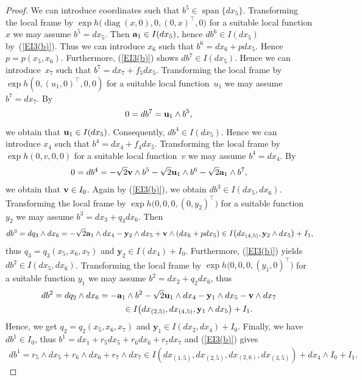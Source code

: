 \documentclass[11pt]{article}
\numberwithin{equation}{section}
\newcommand\bu{{\mathbf u}}
\newcommand\by{{\mathbf y}}
\newcommand\bv{{\mathbf v}}
\newcommand{\Span}{\operatorname{span}}
\newcommand{\diag}{\operatorname{diag}}
\begin{document}
\begin{proof} We can introduce coordinates such that $b^5\in\Span\{dx_5\}$. Transforming the local frame by $\exp h\big(\diag(x,0),0,(0,x)^\top,0\big)$ for a suitable local function $x$ we may assume $b^5=dx_5$. 	 Then ${\bf a}_ 1 \in I(dx_5)$, hence $db^6\in I(dx_5)$ by~(\ref{EI3(b)}). Thus we can introduce $x_6$ such that $b^6=dx_6 +p dx_5$. Hence $p=p(x_5,x_6)$. Furthermore, (\ref{EI3(b)}) shows $db^7\in I(dx_5)$. Hence we can introduce~$x_7$ such that $b^7=dx_7+f_5 dx_5$. Transforming the local frame by $\exp h(0,(u_1,0)^\top,0,0)$ for a suitable local function~$u_1$ we may assume $b^7=dx_7$. By
\begin{gather*}
0 = d b^7 = {\bf u}_1 \wedge b^5,
\end{gather*}
we obtain that ${\bf u}_1 \in I (dx_5)$. Consequently, $db^4 \in I(dx_5)$. Hence we can introduce $x_4$ such that $b^4 = dx_4 + f_4 dx_5$. Transforming the local frame by $\exp h(0, v, 0, 0)$ for a suitable local function~$v$ we may assume $b^4 = dx_4$. By
\begin{gather*}
0 = d b^4 = - \sqrt{2} {\bf v} \wedge b^5 - \sqrt{2} {\bf u}_1 \wedge b^6 - \sqrt{2} {\bf a}_1 \wedge b^7,
\end{gather*}
we obtain that ${\bf v} \in I_0$. Again by (\ref{EI3(b)}), we obtain $db^3 \in I(dx_5,dx_6)$. Transforming the local frame by $\exp h\big(0,0,0,(0,y_2)^\top\big)$ for a suitable function $y_2$ we may assume $b^3 = dx_3 + q_3 dx_6$. Then
\begin{gather*}
db^3 = dq_3\wedge dx_6= -\sqrt2 {\bf a}_1 \wedge dx_4-\by_2\wedge dx_5+\bv\wedge (dx_6+pdx_5)
\in I\big(dx_{(4,5)}, \by_2\wedge dx_5\big)+I_1,\!
\end{gather*}
thus $q_3=q_3(x_5,x_6,x_7)$ and $\by_2\in I(dx_4)+I_0$. Furthermore, (\ref{EI3(b)}) yields $db^2\in I(dx_5,dx_6)$. Transforming the local frame by $\exp h\big(0,0,0,(y_1,0)^\top\big)$ for a suitable function $y_1$ we may assume $b^2=dx_2+q_2 dx_6$, thus
\begin{gather*}
db^2 = dq_2\wedge dx_6 = -{\bf a}_ 1 \wedge b^2 -\sqrt2 \bu_1\wedge dx_4-\by_1\wedge dx_5-\bv\wedge dx_7\\
\hphantom{db^2 = dq_2\wedge dx_6}{} \in I\big(dx_{(2,5)}, dx_{(4,5)}, \by_1\wedge dx_5\big)+I_1.
\end{gather*}
Hence, we get $q_2=q_2(x_5,x_6,x_7)$ and $\by_1\in I(dx_2, dx_4)+I_0$. Finally, we have $db^1\in I_0$, thus $b^1=dx_1+r_5dx_5+r_6dx_6+r_7dx_7$ and (\ref{EI3(b)}) gives
\begin{gather*}
db^1 = r_5\wedge dx_5+r_6\wedge dx_6+r_7\wedge dx_7
 \in I( dx_{(1,5)}, dx_{(2,5)}, dx_{(2,6)}, dx_{(3,5)} )+dx_4\wedge I_0 +I_1.
\end{gather*}


\end{proof}
\end{document}
